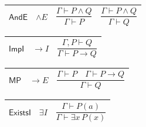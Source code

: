 \documentclass[11pt]{amsart}
\newlength{\FTCThreeColumnBody}
\begin{document}
{\begin{tabular}{|@{}>{\centering\arraybackslash}m{0.176056\FTCThreeColumnBody}|>{\centering\arraybackslash}m{0.225352\FTCThreeColumnBody}|>{\centering\arraybackslash}m{0.598591\FTCThreeColumnBody}|}
\end{tabular}%
\par\setlength{\parskip}{0pt}\nointerlineskip
\noindent
\begin{tabular}{|@{}>{\centering\arraybackslash}m{0.176056\FTCThreeColumnBody}|>{\centering\arraybackslash}m{0.225352\FTCThreeColumnBody}|>{\centering\arraybackslash}m{0.598591\FTCThreeColumnBody}|}\hline
\hypertarget{rule:AndE}{$\displaystyle \textsf{AndE}$} & $\displaystyle \wedge E$ & \rule[-3.3ex]{0pt}{7.8ex}$\displaystyle \dfrac{\Gamma\vdash P\land Q}{\Gamma\vdash P}\quad\dfrac{\Gamma\vdash P\land Q}{\Gamma\vdash Q}$\\ \hline
\end{tabular}%
\par\setlength{\parskip}{0pt}\nointerlineskip
\noindent
\begin{tabular}{|@{}>{\centering\arraybackslash}m{0.176056\FTCThreeColumnBody}|>{\centering\arraybackslash}m{0.225352\FTCThreeColumnBody}|>{\centering\arraybackslash}m{0.598591\FTCThreeColumnBody}|}\hline
\hypertarget{rule:ImpI}{$\displaystyle \textsf{ImpI}$} & $\displaystyle \to I$ & \rule[-3.3ex]{0pt}{7.8ex}$\displaystyle \dfrac{\Gamma,P\vdash Q}{\Gamma\vdash P\to Q}$\\ \hline
\end{tabular}%
\par\setlength{\parskip}{0pt}\nointerlineskip
\noindent
\begin{tabular}{|@{}>{\centering\arraybackslash}m{0.176056\FTCThreeColumnBody}|>{\centering\arraybackslash}m{0.225352\FTCThreeColumnBody}|>{\centering\arraybackslash}m{0.598591\FTCThreeColumnBody}|}\hline
\hypertarget{rule:MP}{$\displaystyle \textsf{MP}$} & $\displaystyle \to E$ & \rule[-3.3ex]{0pt}{7.8ex}$\displaystyle \dfrac{\Gamma\vdash P\quad\Gamma\vdash P\to Q}{\Gamma\vdash Q}$\\ \hline
\end{tabular}%
\par\setlength{\parskip}{0pt}\nointerlineskip
\noindent
\begin{tabular}{|@{}>{\centering\arraybackslash}m{0.176056\FTCThreeColumnBody}|>{\centering\arraybackslash}m{0.225352\FTCThreeColumnBody}|>{\centering\arraybackslash}m{0.598591\FTCThreeColumnBody}|}\hline
\hypertarget{rule:ExistsI}{$\displaystyle \textsf{ExistsI}$} & $\displaystyle \exists I$ & \rule[-3.3ex]{0pt}{7.8ex}$\displaystyle \dfrac{\Gamma\vdash P(a)}{\Gamma\vdash\exists x\,P(x)}$\\ \hline
\end{tabular}%
\par\setlength{\parskip}{0pt}\nointerlineskip
}
\end{document}
